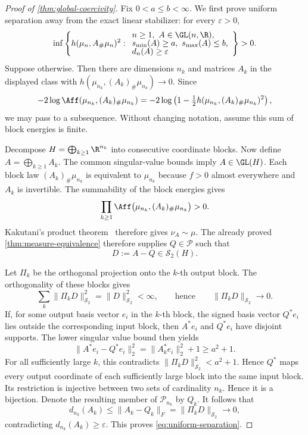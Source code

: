 \begin{proof}[Proof of \cref{thm:global-coercivity}]
Fix \(0<a\le b<\infty\).  We first prove uniform separation away from
the exact linear stabilizer: for every \(\varepsilon>0\),
\begin{equation}
 \inf\left\{
 h(\mu_n,A_\#\mu_n)^2:
 \begin{array}{l}
 n\ge1,\ A\in\GL(n,\R),\\[-2pt]
 s_{\min}(A)\ge a,\ s_{\max}(A)\le b,\\[-2pt]
 d_n(A)\ge\varepsilon
 \end{array}\right\}>0.
 \label{eq:uniform-separation}
\end{equation}
Suppose otherwise.
Then there are dimensions \(n_k\) and matrices \(A_k\) in the displayed class
with
\(h(\mu_{n_k},(A_k)_\#\mu_{n_k})\to0\).  Since
\[
 -2\log\Aff(\mu_{n_k},(A_k)_\#\mu_{n_k})
 =-2\log\left(1-\tfrac12
 h(\mu_{n_k},(A_k)_\#\mu_{n_k})^2\right),
 \]
we may pass to a subsequence.
Without changing notation, assume this sum of block energies is finite.

Decompose \(H=\bigoplus_{k\ge1}\R^{n_k}\) into consecutive
coordinate blocks.
Now define
\(A=\bigoplus_{k\ge1}A_k\).  The common singular-value bounds imply
\(A\in\GL(H)\).  Each block law $(A_k)_\#\mu_{n_k}$ is
equivalent to $\mu_{n_k}$ because $f>0$ almost everywhere and $A_k$ is
invertible.  The summability of the block energies gives
\[
 \prod_{k\ge1}\Aff\bigl(\mu_{n_k},(A_k)_\#\mu_{n_k}\bigr)>0.
\]
Kakutani's product theorem~\cite{kakutani1948equivalence} therefore
gives \(\nu_A\sim\mu\).  The already proved
\cref{thm:measure-equivalence} therefore supplies \(Q\in\mathcal P\) such that
\begin{equation}
 D:=A-Q\in\mathcal S_2(H).
 \label{eq:globalization-D}
\end{equation}

Let \(\Pi_k\) be the orthogonal projection onto the \(k\)-th output block.
The orthogonality of these blocks gives
\[
 \sum_k\|\Pi_kD\|_{\mathcal S_2}^2=\|D\|_{\mathcal S_2}^2<\infty,
 \qquad\text{hence}\qquad
 \|\Pi_kD\|_{\mathcal S_2}\longrightarrow0.
 \]
If, for some output basis vector \(e_i\) in the \(k\)-th block, the signed
basis vector \(Q^*e_i\) lies outside the corresponding input block, then
\(A^*e_i\) and \(Q^*e_i\) have disjoint supports.
The lower singular value bound then yields
\begin{equation}
 \|A^*e_i-Q^*e_i\|_2^2
 =\|A_k^*e_i\|_2^2+1\ge a^2+1.
 \label{eq:row-escape-cost}
 \end{equation}
For all sufficiently large \(k\), this contradicts
\(\|\Pi_kD\|_{\mathcal S_2}^2<a^2+1\).
Hence \(Q^*\) maps every output coordinate of each sufficiently large block
into the same input block.
Its restriction is injective between two sets of cardinality \(n_k\).
Hence it is a bijection.
Denote the resulting member of \(\mathcal P_{n_k}\) by
\(Q_k\).  It follows that
\[
 d_{n_k}(A_k)
 \le\|A_k-Q_k\|_F
 =\|\Pi_kD\|_{\mathcal S_2}\longrightarrow0,
\]
contradicting \(d_{n_k}(A_k)\ge\varepsilon\).  This proves
\eqref{eq:uniform-separation}.


\end{proof}
